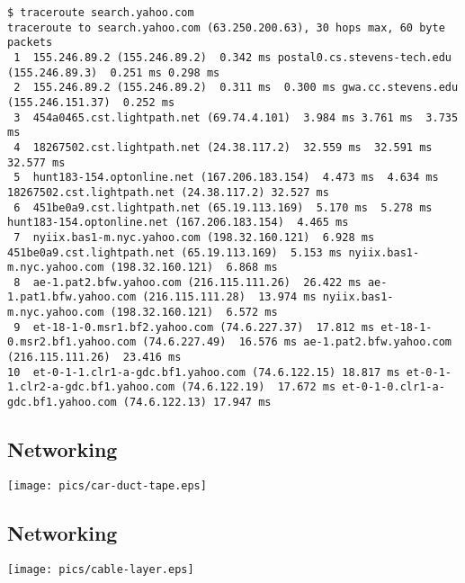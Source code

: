 \documentclass[xga]{xdvislides}
\begin{document}
\begin{verbatim}
$ traceroute search.yahoo.com
traceroute to search.yahoo.com (63.250.200.63), 30 hops max, 60 byte packets
 1  155.246.89.2 (155.246.89.2)  0.342 ms postal0.cs.stevens-tech.edu (155.246.89.3)  0.251 ms 0.298 ms
 2  155.246.89.2 (155.246.89.2)  0.311 ms  0.300 ms gwa.cc.stevens.edu (155.246.151.37)  0.252 ms
 3  454a0465.cst.lightpath.net (69.74.4.101)  3.984 ms 3.761 ms  3.735 ms
 4  18267502.cst.lightpath.net (24.38.117.2)  32.559 ms  32.591 ms  32.577 ms
 5  hunt183-154.optonline.net (167.206.183.154)  4.473 ms  4.634 ms 18267502.cst.lightpath.net (24.38.117.2) 32.527 ms
 6  451be0a9.cst.lightpath.net (65.19.113.169)  5.170 ms  5.278 ms hunt183-154.optonline.net (167.206.183.154)  4.465 ms
 7  nyiix.bas1-m.nyc.yahoo.com (198.32.160.121)  6.928 ms 451be0a9.cst.lightpath.net (65.19.113.169)  5.153 ms nyiix.bas1-m.nyc.yahoo.com (198.32.160.121)  6.868 ms
 8  ae-1.pat2.bfw.yahoo.com (216.115.111.26)  26.422 ms ae-1.pat1.bfw.yahoo.com (216.115.111.28)  13.974 ms nyiix.bas1-m.nyc.yahoo.com (198.32.160.121)  6.572 ms
 9  et-18-1-0.msr1.bf2.yahoo.com (74.6.227.37)  17.812 ms et-18-1-0.msr2.bf1.yahoo.com (74.6.227.49)  16.576 ms ae-1.pat2.bfw.yahoo.com (216.115.111.26)  23.416 ms
10  et-0-1-1.clr1-a-gdc.bf1.yahoo.com (74.6.122.15) 18.817 ms et-0-1-1.clr2-a-gdc.bf1.yahoo.com (74.6.122.19)  17.672 ms et-0-1-0.clr1-a-gdc.bf1.yahoo.com (74.6.122.13) 17.947 ms
\end{verbatim}

\subsection{Networking}
\vspace*{\fill}
\begin{center}
	\texttt{[image: pics/car-duct-tape.eps]} \\
\end{center}
\vspace*{\fill}

\subsection{Networking}
\vspace*{\fill}
\begin{center}
	\texttt{[image: pics/cable-layer.eps]} \\
\end{center}
\vspace*{\fill}
\end{document}
